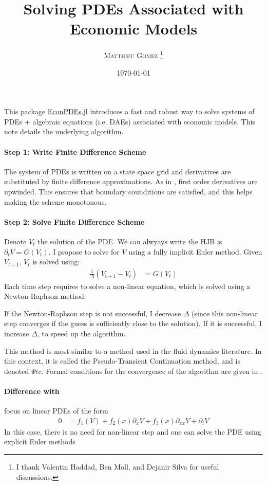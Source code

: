 \documentclass[english]{article}
\begin{document}
	\title{Solving PDEs Associated with Economic Models}
	\author{\large{\textsc{Matthieu Gomez \thanks{I thank Valentin Haddad, Ben Moll, and Dejanir Silva for useful discussions.}}}}
	\date{\today}
	\maketitle
	This package \href{https://github.com/matthieugomez/EconPDEs.jl}{EconPDEs.jl} introduces a fast and robust way to solve systems of PDEs + algebraic equations (i.e. DAEs) associated with economic models. This note details the underlying algorithm. 

	\paragraph{Step 1: Write Finite Difference Scheme}
	The system of PDEs is written on a state space grid and derivatives are substituted by finite difference approximations. As in \citet{achdou2014heterogeneous},  first order derivatives are upwinded. This ensures that boundary counditions are satisfied, and this helps making the scheme monotonous.

	\paragraph{Step 2: Solve Finite Difference Scheme}

	Denote $V_t$  the solution of the PDE. We can alwyays write the HJB is $\partial_t V =G(V_t)$. 
	I propose to solve for $V$ using a fully implicit Euler method.  Given $V_{t+1}$, $V_t$ is solved using:
	\begin{align*}
		 \frac{1}{\Delta}(V_{t+1} -V_{t})&= G(V_{t})
	\end{align*}
	Each time step requires to solve a non-linear equation, which is solved using a Newton-Raphson method. 

	If the Newton-Raphson step is not successful, I decrease $\Delta$ (since this non-linear step converges if the guess is sufficiently close to the solution). If it is successful, I increase $\Delta$, to speed up the algorithm.

	This method is most similar to a method used in the fluid dynamics literature. In this context, it is called the Pseudo-Transient Continuation method, and is denoted $\Psi tc$. Formal conditions for the convergence of the algorithm are given in  \citet{kelley1998convergence}.\par

	\paragraph{Difference with \citet{achdou2014heterogeneous}} 	 \citet{achdou2014heterogeneous} focus on linear PDEs of the form
	\begin{align*}
		0&=f_1(V)  + f_2(x) \partial_x V  + f_3(x) \partial_{xx} V + \partial_t V
	\end{align*}
	In this case, there is no need for non-linear step and one can solve the PDE using explicit Euler methods



		
	
	
\end{document}
